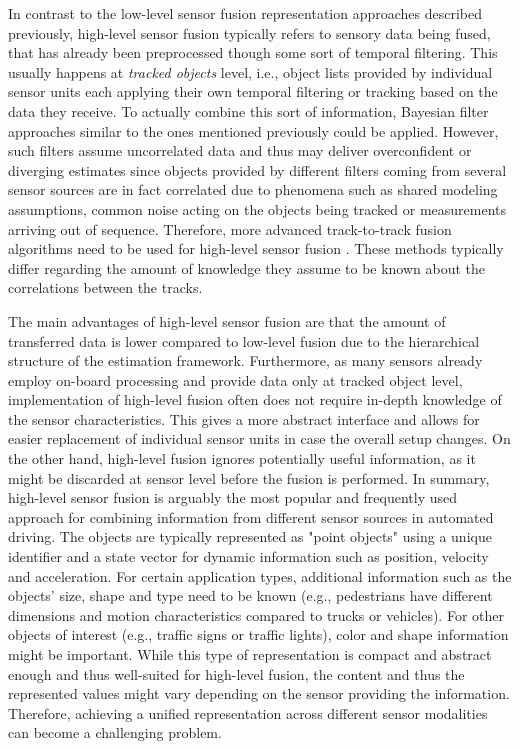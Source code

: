 In contrast to the low-level sensor fusion representation approaches described previously, high-level sensor fusion typically refers to sensory data being fused, that has already been preprocessed though some sort of temporal filtering.
This usually happens at \emph{tracked objects} level, i.e., object lists provided by individual sensor units each applying their own temporal filtering or tracking based on the data they receive.
To actually combine this sort of information, Bayesian filter approaches similar to the ones mentioned previously could be applied. 
However, such filters assume uncorrelated data and thus may deliver overconfident or diverging estimates since objects provided by different filters coming from several sensor sources are in fact correlated due to phenomena such as shared modeling assumptions, common noise acting on the objects being tracked or measurements arriving out of sequence.
Therefore, more advanced track-to-track fusion algorithms need to be used for high-level sensor fusion \cite{Tian2010, Aeberhard2012}.
These methods typically differ regarding the amount of knowledge they assume to be known about the correlations between the tracks.

The main advantages of high-level sensor fusion are that the amount of transferred data is lower compared to low-level fusion due to the hierarchical structure of the estimation framework.
Furthermore, as many sensors already employ on-board processing and provide data only at tracked object level, implementation of high-level fusion often does not require in-depth knowledge of the sensor characteristics.
This gives a more abstract interface and allows for easier replacement of individual sensor units in case the overall setup changes.
On the other hand, high-level fusion ignores potentially useful information, as it might be discarded at sensor level before the fusion is performed.
In summary, high-level sensor fusion is arguably the most popular and frequently used approach for combining information from different sensor sources in automated driving.
The objects are typically represented as "point objects" using a unique identifier and a state vector for dynamic information such as position, velocity and acceleration.
For certain application types, additional information such as the objects' size, shape and type need to be known (e.g., pedestrians have different dimensions and motion characteristics compared to trucks or vehicles).
For other objects of interest (e.g., traffic signs or traffic lights), color and shape information might be important.
While this type of representation is compact and abstract enough and thus well-suited for high-level fusion, the content and thus the represented values might vary depending on the sensor providing the information.
Therefore, achieving a unified representation across different sensor modalities can become a challenging problem.


